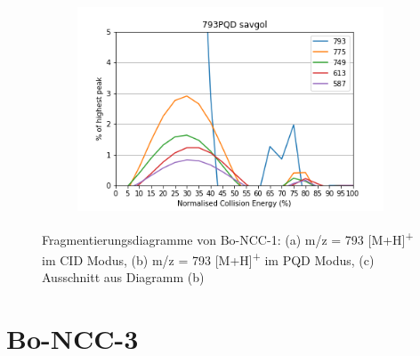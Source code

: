 \begin{figure}[!htbp]
  \begin{subfigure}[b]{0.5\textwidth}
    \includegraphics[width=\textwidth]{content/Anhang/ESIMS/Bo-NCC-1/793PQD-793savgolv5.png}
    \caption{}
  \end{subfigure}
  
  \caption[Fragmentierungsdiagramme von Bo-NCC-1, Quelle: Autor]{Fragmentierungsdiagramme von Bo-NCC-1: (a) m/z = 793 [M+H]\textsuperscript{+} im CID Modus, (b) m/z = 793 [M+H]\textsuperscript{+} im PQD Modus, (c) Ausschnitt aus Diagramm (b)}
\end{figure}

\pagebreak
\section{Bo-NCC-3}


